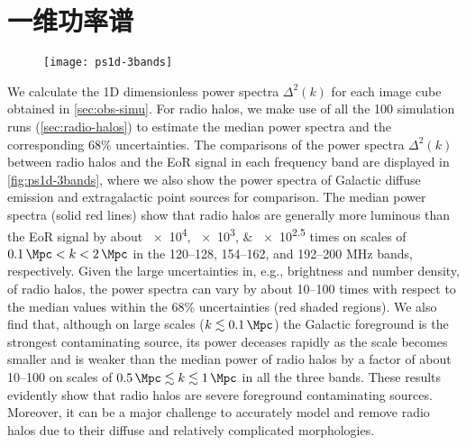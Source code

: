 \section{一维功率谱}
\label{sec:ps1d}

\begin{figure}[htp]
  \centering
  \texttt{[image: ps1d-3bands]}
  \label{fig:ps1d-3bands}
\end{figure}

We calculate the 1D dimensionless power spectra $\Delta^2(k)$ for each
image cube obtained in \autoref{sec:obs-simu}.
For radio halos, we make use of all the 100 simulation runs
(\autoref{sec:radio-halos}) to estimate the median power spectra and
the corresponding 68\% uncertainties.
The comparisons of the power spectra $\Delta^2(k)$ between radio halos
and the EoR signal in each frequency band are displayed
in \autoref{fig:ps1d-3bands}, where we also show the power spectra of
Galactic diffuse emission and extragalactic point sources for comparison.
The median power spectra (solid red lines) show that radio halos are
generally more luminous than the EoR signal by about
\numlist{e4; e3; e2.5} times
on scales of $\SI{0.1}{\per\Mpc} < k < \SI{2}{\per\Mpc}$
in the \numrange{120}{128}, \numrange{154}{162}, and \numrange{192}{200}
\si{\MHz} bands, respectively.
Given the large uncertainties in, e.g., brightness and number density,
of radio halos, the power spectra can vary by about \numrange{10}{100}
times with respect to the median values within the 68\%
uncertainties (red shaded regions).
We also find that, although on large scales
($k \lesssim \SI{0.1}{\per\Mpc}$) the Galactic foreground is the
strongest contaminating source, its power deceases rapidly as the
scale becomes smaller and is weaker than the median power of radio halos
by a factor of about \numrange{10}{100} on scales of
$\SI{0.5}{\per\Mpc} \lesssim k \lesssim \SI{1}{\per\Mpc}$
in all the three bands.
These results evidently show that radio halos are severe foreground
contaminating sources.
Moreover, it can be a major challenge to accurately model and remove radio
halos due to their diffuse and relatively complicated morphologies.


